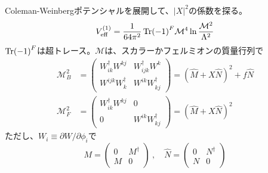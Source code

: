 \documentclass[
  unicode,a4paper,9pt,
  xcolor = {dvipsnames,svgnames},
  hyperref ={colorlinks=true,citecolor=Navy,linkcolor=NavyBlue,urlcolor=purple},
  ja=standard,lualatex
]{beamer}
\begin{document}
\begin{frame}
  \frametitle{\subsecname}

  Coleman-Weinbergポテンシャルを展開して、$|X|^2$の係数を探る。
  \begin{equation}
    V_{\textrm{eff}}^{(1)}
    =
    \frac{1}{64\pi^2}
    \Tr (-1)^{F}
    \mathcal{M}^{4}\ln\frac{\mathcal{M}^2}{\Lambda^{2}}
    \nonumber
  \end{equation}
  $\Tr (-1)^{F}$は超トレース。$\mathcal{M}$は、スカラーかフェルミオンの質量行列で
  \begin{align}
    \mathcal{M}_{B}^2
     & =
    \begin{pmatrix}
      W^{\dag}_{ik}W^{kj} & W^{\dag}_{ijk}W^{k} \\
      W^{ijk}W_{k}^{\dag} & W^{ik}W_{kj}^{\dag}
    \end{pmatrix}
    =
    (\hat{M}+X\hat{N})^2+f\hat{N}
    \nonumber
    \\
    \mathcal{M}_{F}^2
     & =
    \begin{pmatrix}
      W^{\dag}_{ik}W^{kj} & 0                   \\
      0                   & W^{ik}W_{kj}^{\dag}
    \end{pmatrix}
    =
    (\hat{M}+X\hat{N})^2
    \nonumber
  \end{align}
  ただし、$W_{i}\equiv\partial W/\partial\phi_{i}$で
  \begin{equation}
    M
    =
    \begin{pmatrix}
      0 & M^{\dag} \\
      M & 0
    \end{pmatrix}
    \ ,\quad
    \hat{N}
    =
    \begin{pmatrix}
      0 & N^{\dag} \\
      N & 0
    \end{pmatrix}
    \nonumber
  \end{equation}

\end{frame}
\end{document}

